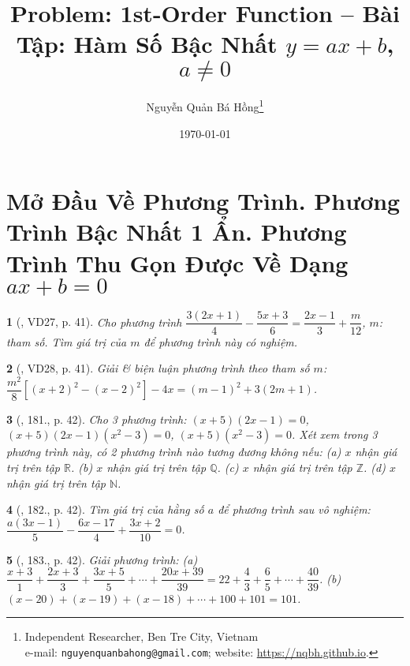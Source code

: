 \documentclass{article}
\title{Problem: 1st-Order Function -- Bài Tập: Hàm Số Bậc Nhất $y = ax + b$, $a\ne0$}
\author{Nguyễn Quản Bá Hồng\footnote{Independent Researcher, Ben Tre City, Vietnam\\e-mail: \texttt{nguyenquanbahong@gmail.com}; website: \url{https://nqbh.github.io}.}}
\date{\today}
\newtheorem{baitoan}{}
\begin{document}
\maketitle
\tableofcontents


\section{Mở Đầu Về Phương Trình. Phương Trình Bậc Nhất 1 Ẩn. Phương Trình Thu Gọn Được Về Dạng $ax + b = 0$}

\begin{baitoan}[\cite{Tuyen_Toan_8}, VD27, p. 41]
	Cho phương trình $\dfrac{3(2x + 1)}{4} - \dfrac{5x + 3}{6} = \dfrac{2x - 1}{3} + \dfrac{m}{12}$, $m$: tham số. Tìm giá trị của $m$ để phương trình này có nghiệm.
\end{baitoan}

\begin{baitoan}[\cite{Tuyen_Toan_8}, VD28, p. 41]
	Giải \& biện luận phương trình theo tham số $m$: $\dfrac{m^2}{8}\left[(x + 2)^2 - (x  - 2)^2\right] - 4x = (m - 1)^2 + 3(2m + 1)$.
\end{baitoan}

\begin{baitoan}[\cite{Tuyen_Toan_8}, 181., p. 42]
	Cho 3 phương trình: $(x + 5)(2x - 1) = 0$, $(x + 5)(2x - 1)(x^2 - 3) = 0$, $(x + 5)(x^2 - 3) = 0$. Xét xem trong 3 phương trình này, có 2 phương trình nào tương đương không nếu: (a) $x$ nhận giá trị trên tập $\mathbb{R}$. (b) $x$ nhận giá trị trên tập $\mathbb{Q}$. (c) $x$ nhận giá trị trên tập $\mathbb{Z}$. (d) $x$ nhận giá trị trên tập $\mathbb{N}$.
\end{baitoan}

\begin{baitoan}[\cite{Tuyen_Toan_8}, 182., p. 42]
	Tìm giá trị của hằng số $a$ để phương trình sau vô nghiệm: $\dfrac{a(3x - 1)}{5} - \dfrac{6x - 17}{4} + \dfrac{3x + 2}{10} = 0$.
\end{baitoan}

\begin{baitoan}[\cite{Tuyen_Toan_8}, 183., p. 42]
	Giải phương trình: (a) $\dfrac{x + 3}{1} + \dfrac{2x + 3}{3} + \dfrac{3x + 5}{5} + \cdots + \dfrac{20x + 39}{39} = 22 + \dfrac{4}{3} + \dfrac{6}{5} + \cdots + \dfrac{40}{39}$. (b) $(x - 20) + (x - 19) + (x - 18) + \cdots + 100 + 101 = 101$.
\end{baitoan}
\end{document}
